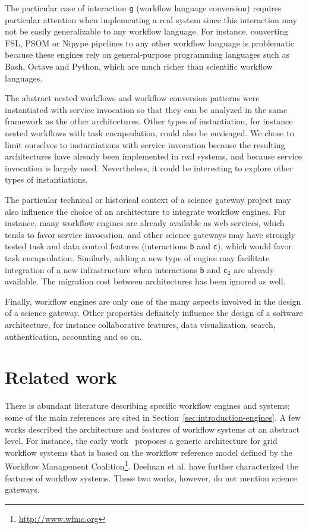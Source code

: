 \documentclass[preprint,3p,twocolumn]{elsarticle}
\begin{document}
The particular case of interaction \texttt{g} (workflow language
conversion) requires particular attention when implementing a real
system since this interaction may not be easily generalizable to any
workflow language. For instance, converting FSL, PSOM or Nipype
pipelines to any other workflow language is problematic because these
engines rely on general-purpose programming languages such as Bash,
Octave and Python, which are much richer than scientific workflow
languages.

The abstract nested workflows and workflow conversion patterns were
instantiated with service invocation so that they can be analyzed in
the same framework as the other architectures. Other types of
instantiation, for instance nested workflows with task encapsulation,
could also be envisaged. We chose to limit ourselves to instantiations
with service invocation because the resulting architectures have already been
implemented in real systems, and because service invocation is largely
used. Nevertheless, it could be interesting to explore other types of
instantiations.

The particular technical or historical context of a science gateway
project may also influence the choice of an architecture to
integrate workflow engines. For instance, many workflow engines are
already available as web services, which tends to favor service
invocation, and other science gateways may have strongly tested task
and data control features (interactions \texttt{b} and \texttt{c}),
which would favor task encapsulation. Similarly, adding a new type of engine
may facilitate integration of a new infrastructure when interactions
\texttt{b} and \texttt{c$_2$} are already available. The migration
cost between architectures has been ignored as well.

Finally, workflow engines are only one of the many aspects involved in
the design of a science gateway. Other properties definitely influence
the design of a software architecture, for instance collaborative
features, data visualization, search, authentication, accounting and
so on.

\section{Related work}
\label{sec:related}
 
There is abundant literature describing specific workflow engines and
systems; some of the main references are cited in
Section~\ref{sec:introduction-engines}. A few works described the
architecture and features of workflow systems at an abstract level. For
instance, the early work~\cite{yuTaxonomy} proposes a generic
architecture for grid workflow systems that is based on the workflow
reference model defined by the Workflow Management
Coalition\footnote{\url{http://www.wfmc.org}}.  Deelman et
al. \cite{deelman2009workflows} have further characterized the
features of workflow systems. These two works, however, do not mention
science gateways.
\end{document}
